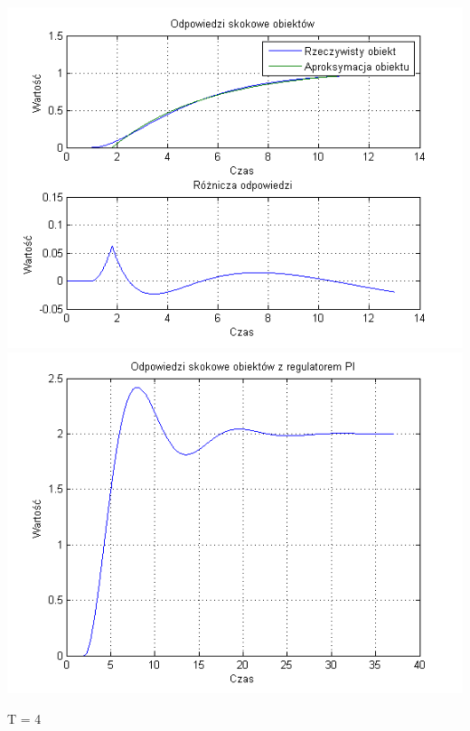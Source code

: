 \documentclass[10pt,a4paper]{article}
\begin{document}
\begin{center}
\includegraphics[scale=1]{images/jeden/skrypt_65.png}\\
\includegraphics[scale=1]{images/jeden/skrypt_66.png}\\
\end{center}
\newpage
T = 4
\end{document}
